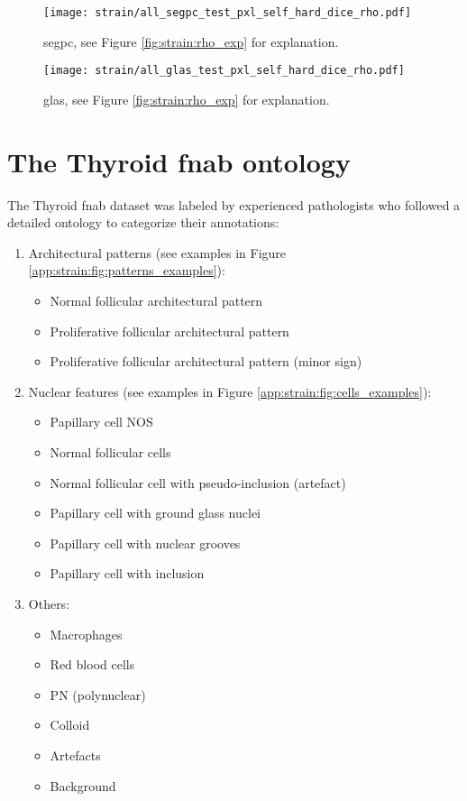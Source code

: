 \begin{figure}
    \centering
    \texttt{[image: strain/all\_segpc\_test\_pxl\_self\_hard\_dice\_rho.pdf]}
    \caption{\acrshort{segpc}, see Figure \ref{fig:strain:rho_exp} for explanation.}
    \label{app:strain:fig:rho_exp_segpc}
\end{figure} 

\begin{figure}
    \centering
    \texttt{[image: strain/all\_glas\_test\_pxl\_self\_hard\_dice\_rho.pdf]}
    \caption{\acrshort{glas}, see Figure \ref{fig:strain:rho_exp} for explanation.}
    \label{app:strain:fig:rho_exp_glas}
\end{figure}
  
\section{The Thyroid \acrshort{fnab} ontology}
\label{app:strain:sec:thyroidontology}

The Thyroid \acrshort{fnab} dataset was labeled by experienced pathologists who followed a detailed ontology to categorize their annotations:


\begin{enumerate}
	\item Architectural patterns (see examples in Figure \ref{app:strain:fig:patterns_examples}):
	\begin{itemize}
		\item Normal follicular architectural pattern
		\item Proliferative follicular architectural pattern
		\item Proliferative follicular architectural pattern (minor sign)
	\end{itemize}
	\item Nuclear features (see examples in Figure \ref{app:strain:fig:cells_examples}):
	\begin{itemize}
		\item Papillary cell NOS
		\item Normal follicular cells
		\item Normal follicular cell with pseudo-inclusion (artefact)
		\item Papillary cell with ground glass nuclei
		\item Papillary cell with nuclear grooves
		\item Papillary cell with inclusion
	\end{itemize}
	\item Others:
	\begin{itemize}
		\item Macrophages
		\item Red blood cells
		\item PN (polynuclear)
		\item Colloid
		\item Artefacts
		\item Background
	\end{itemize}
\end{enumerate}

